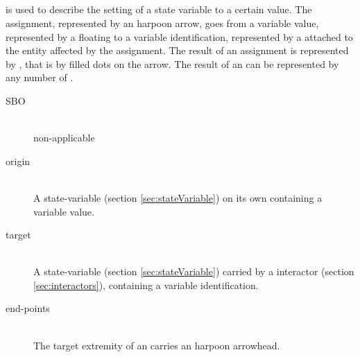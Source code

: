 
\subsection{}\label{sec:assignment}

 is used to describe the setting of a state variable to a certain value. The assignment, represented by an harpoon arrow, goes from a variable value, represented by a floating  to a variable identification, represented by a  attached to the entity affected by the assignment.  The result of an assignment is represented by , that is by filled dots on the arrow. The result of an  can be represented by any number of .


\begin{description}
 \item[SBO]\mbox{}\\ non-applicable
 \item[origin]\mbox{}\\ A state-variable (section \ref{sec:stateVariable}) on its own containing a variable value.
 \item[target]\mbox{}\\ A state-variable (section \ref{sec:stateVariable}) carried by a interactor (section \ref{sec:interactors}), containing a variable identification.
 \item[end-points]\mbox{}\\ The target extremity of an  carries an harpoon arrowhead.
 \end{description}

